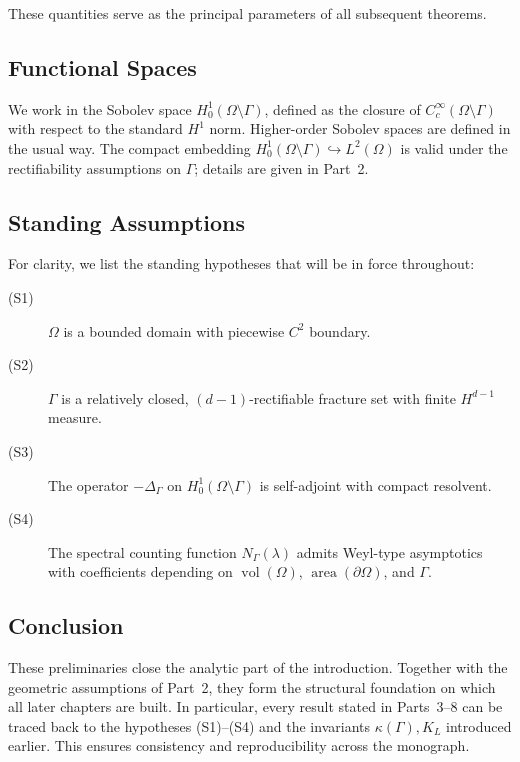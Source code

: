 These quantities serve as the principal parameters of all subsequent theorems.

\subsection{Functional Spaces}

We work in the Sobolev space $H^1_0(\Omega \setminus \Gamma)$, defined as the
closure of $C_c^\infty(\Omega \setminus \Gamma)$ with respect to the standard
$H^1$ norm. Higher-order Sobolev spaces are defined in the usual way. The
compact embedding $H^1_0(\Omega \setminus \Gamma) \hookrightarrow L^2(\Omega)$
is valid under the rectifiability assumptions on $\Gamma$; details are given in
Part~2.

\subsection{Standing Assumptions}

For clarity, we list the standing hypotheses that will be in force throughout:

\begin{description}
  \item[(S1)] $\Omega$ is a bounded domain with piecewise $C^2$ boundary.
  \item[(S2)] $\Gamma$ is a relatively closed, $(d-1)$-rectifiable fracture set
  with finite $H^{d-1}$ measure.
  \item[(S3)] The operator $-\Delta_\Gamma$ on $H^1_0(\Omega \setminus \Gamma)$
  is self-adjoint with compact resolvent.
  \item[(S4)] The spectral counting function $N_\Gamma(\lambda)$ admits Weyl-type
  asymptotics with coefficients depending on $\operatorname{vol}(\Omega)$,
  $\operatorname{area}(\partial\Omega)$, and $\Gamma$.
\end{description}

\subsection{Conclusion}

These preliminaries close the analytic part of the introduction. Together with
the geometric assumptions of Part~2, they form the structural foundation on
which all later chapters are built. In particular, every result stated in
Parts~3–8 can be traced back to the hypotheses (S1)–(S4) and the invariants
$\kappa(\Gamma), K_L$ introduced earlier. This ensures consistency and
reproducibility across the monograph.

